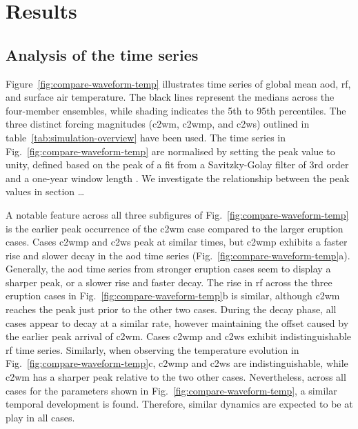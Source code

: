 \documentclass{ametsocV6.1}
\begin{document}
\section{Results}\label{sec:results}


\subsection{Analysis of the time series}

Figure~\ref{fig:compare-waveform-temp} illustrates time series of global mean \gls{aod},
\gls{rf}, and surface air temperature. The black lines represent the medians across the
four-member ensembles, while shading indicates the 5th to 95th percentiles. The three
distinct forcing magnitudes (\gls{c2wm}, \gls{c2wmp}, and \gls{c2ws}) outlined in
table~\ref{tab:simulation-overview} have been used. The time series in
Fig.~\ref{fig:compare-waveform-temp} are normalised by setting the peak value to unity,
defined based on the peak of a fit from a Savitzky-Golay filter of 3rd order and a
one-year window length \citep{savitzky1964}. We investigate the relationship between the peak values in section \dots

A notable feature across all three subfigures of Fig.~\ref{fig:compare-waveform-temp} is
the earlier peak occurrence of the \gls{c2wm} case compared to the larger eruption
cases. Cases \gls{c2wmp} and \gls{c2ws} peak at similar times, but \gls{c2wmp} exhibits
a faster rise and slower decay in the \gls{aod} time series
(Fig.~\ref{fig:compare-waveform-temp}a). Generally, the \gls{aod} time series from
stronger eruption cases seem to display a sharper peak, or a slower rise and faster
decay. The rise in \gls{rf} across the three eruption cases in Fig.~\ref{fig:compare-waveform-temp}b
is similar, although \gls{c2wm} reaches the peak just prior to the other two cases.
During the decay phase, all cases appear to decay at a similar rate, however maintaining
the offset caused by the earlier peak arrival of \gls{c2wm}. Cases \gls{c2wmp} and
\gls{c2ws} exhibit indistinguishable \gls{rf} time series. Similarly, when observing the
temperature evolution in Fig.~\ref{fig:compare-waveform-temp}c, \gls{c2wmp} and
\gls{c2ws} are indistinguishable, while \gls{c2wm} has a sharper peak relative to the
two other cases. Nevertheless, across all cases for the parameters shown in
Fig.~\ref{fig:compare-waveform-temp}, a similar temporal development is found.
Therefore, similar dynamics are expected to be at play in all cases.
\end{document}
